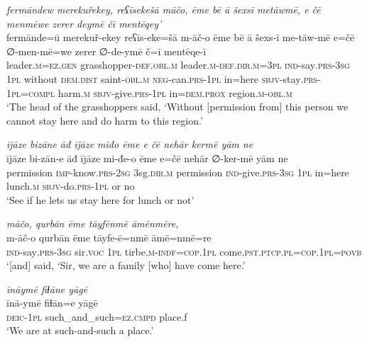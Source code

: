 \ea \label{PM.5}
\textit{fermāndew merekuřekey, reʕīsekešā māčo, ēme bē ā šexsī metāwmē, e čē menmēwe zerer deymē čī mentēqey’} \\ 
\gll fermānde=ū merekuř-ekey reʕīs-eke=šā m-āč-o ēme bē ā šexs-ī me-tāw-mē e=čē ∅-men-mē=we zerer ∅-de-ymē č=ī mentēqe-ī \\ 
 leader\textsc{.m}\textsc{\textsc{=ez.gen}} grasshopper\textsc{-def}\textsc{.obl}\textsc{.m} leader\textsc{.m}\textsc{-def}\textsc{.dir}\textsc{.m}\textsc{=3pl} \textsc{ind-}say\textsc{.prs}\textsc{-3sg} \textsc{1pl} without \textsc{dem.dist} saint\textsc{-obl}\textsc{.m} \textsc{neg-}can\textsc{.prs}\textsc{-1pl} in=here \textsc{sbjv-}stay\textsc{.prs}\textsc{-1pl}\textsc{=compl} harm\textsc{.m} \textsc{sbjv-}give\textsc{.prs}-\textsc{1pl} in=\textsc{dem.prox} region\textsc{.m}\textsc{-obl}\textsc{.m} \\ 
\glt `The head of the grasshoppers said, ‘Without [permission from] this person we cannot stay here and do harm to this region.'
\z 
 
\ea \label{PM.9}
\textit{ījāze bizāne āđ ījāze miđo ēme e čē nehār kermē yām ne} \\ 
\gll ījāze bi-zān-e āđ ījāze mi-đe-o ēme e=čē nehār ∅-ker-mē yām ne \\ 
 permission \textsc{imp-}know\textsc{.prs}-\textsc{2sg} 3sg\textsc{.dir}\textsc{.m} permission \textsc{ind-}give\textsc{.prs}\textsc{-3sg} \textsc{1pl} in=here lunch\textsc{.m} \textsc{sbjv-}do\textsc{.prs}\textsc{-1pl} or no \\ 
\glt `See if he lets us stay here for lunch or not'
\z 
 
\ea \label{PM.11}
\textit{māčo, qurbān ēme tāyfēnmē āmēnmēre,} \\ 
\gll m-āč-o qurbān ēme tāyfe-ē=nmē āmē=nmē=re \\ 
 \textsc{ind-}say\textsc{.prs}\textsc{-3sg} sir.\textsc{voc} \textsc{1pl} tirbe\textsc{.m}\textsc{-indf}\textsc{=cop}\textsc{.1pl} come\textsc{.pst}\textsc{.ptcp}\textsc{.pl}\textsc{=cop}\textsc{.1pl}\textsc{=\textsc{povb}} \\ 
\glt `[and] said, ‘Sir, we are a family [who] have come here.'
\z 
 
\ea \label{PM.12}
\textit{īnāymē fiɫāne yāgē} \\ 
\gll īnā-ymē fiɫān=e yāgē \\ 
 \textsc{deic-1pl} such\_and\_such\textsc{=ez}\textsc{.cmpd} place.f \\ 
\glt `We are at such-and-such a place.'
\z 
 
